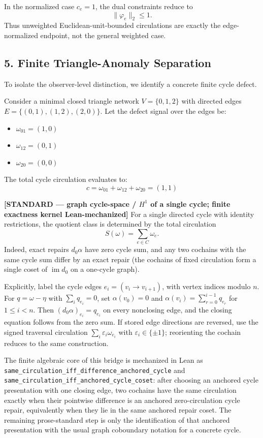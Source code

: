 \documentclass[
  11pt,
]{article}
\providecommand{\tightlist}{%
  \setlength{\itemsep}{0pt}\setlength{\parskip}{0pt}}
\providecommand{\tightlist}{%
  \setlength{\itemsep}{0pt}\setlength{\parskip}{0pt}}
\begin{document}
In the normalized case \(c_e=1\), the dual constraints reduce to \[
\|\varphi_e\|_2\le1.
\] Thus unweighted Euclidean-unit-bounded circulations are exactly the
edge-normalized endpoint, not the general weighted case.

\subsection{5. Finite Triangle-Anomaly
Separation}\label{finite-triangle-anomaly-separation}

To isolate the observer-level distinction, we identify a concrete finite
cycle defect.

Consider a minimal closed triangle network \(V=\{0,1,2\}\) with directed
edges \(E=\{(0,1),(1,2),(2,0)\}\). Let the defect signal over the edges
be:

\begin{itemize}
\tightlist
\item
  \(\omega_{01} = (1,0)\)
\item
  \(\omega_{12} = (0,1)\)
\item
  \(\omega_{20} = (0,0)\)
\end{itemize}

The total cycle circulation evaluates to:
\[c = \omega_{01} + \omega_{12} + \omega_{20} = (1,1)\]

\textbf{{[}STANDARD --- graph cycle-space / \(H^1\) of a single cycle;
finite exactness kernel Lean-mechanized{]}} For a single directed cycle
with identity restrictions, the quotient class is determined by the
total circulation \[
S(\omega)=\sum_{e\in C}\omega_e.
\] Indeed, exact repairs \(d_0\alpha\) have zero cycle sum, and any two
cochains with the same cycle sum differ by an exact repair (the cochains
of fixed circulation form a single coset of \(\operatorname{im} d_0\) on
a one-cycle graph).

Explicitly, label the cycle edges \(e_i=(v_i\to v_{i+1})\), with vertex
indices modulo \(n\). For \(q=\omega-\eta\) with \(\sum_i q_{e_i}=0\),
set \(\alpha(v_0)=0\) and \(\alpha(v_i)=\sum_{r=0}^{i-1}q_{e_r}\) for
\(1\le i<n\). Then \((d_0\alpha)_{e_i}=q_{e_i}\) on every nonclosing
edge, and the closing equation follows from the zero sum. If stored edge
directions are reversed, use the signed traversal circulation
\(\sum_i\varepsilon_i\omega_{e_i}\) with \(\varepsilon_i\in\{\pm1\}\);
reorienting the cochain reduces to the same construction.

The finite algebraic core of this bridge is mechanized in Lean as
\texttt{same\_circulation\_iff\_difference\_anchored\_cycle} and
\texttt{same\_circulation\_iff\_anchored\_cycle\_coset}: after choosing
an anchored cycle presentation with one closing edge, two cochains have
the same circulation exactly when their pointwise difference is an
anchored zero-circulation cycle repair, equivalently when they lie in
the same anchored repair coset. The remaining prose-standard step is
only the identification of that anchored presentation with the usual
graph coboundary notation for a concrete cycle.
\end{document}
